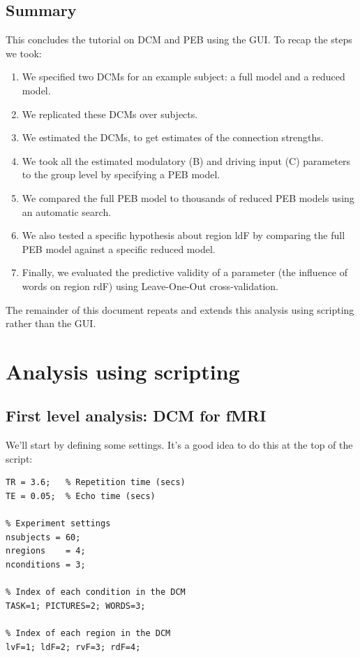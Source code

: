 \documentclass{article}
\begin{document}
\subsection{Summary} \label{GUI_summary}
This concludes the tutorial on DCM and PEB using the GUI. To recap the steps we took:
\begin{enumerate}
    \item We specified two DCMs for an example subject: a full model and a reduced model.
    \item We replicated these DCMs over subjects.
    \item We estimated the DCMs, to get estimates of the connection strengths.
    \item We took all the estimated modulatory (B) and driving input (C) parameters to the group level by specifying a PEB model.
    \item We compared the full PEB model to thousands of reduced PEB models using an automatic search.
    \item We also tested a specific hypothesis about region ldF by comparing the full PEB model against a specific reduced model.
    \item Finally, we evaluated the predictive validity of a parameter (the influence of words on region rdF) using Leave-One-Out cross-validation.
\end{enumerate}

The remainder of this document repeats and extends this analysis using scripting rather than the GUI.


\section{Analysis using scripting}
\subsection{First level analysis: DCM for fMRI}

We'll start by defining some settings. It's a good idea to do this at the top of the script:

\begin{lstlisting}[style=Matlab-editor,caption=Settings]
% MRI scanner settings
TR = 3.6;   % Repetition time (secs)
TE = 0.05;  % Echo time (secs)

% Experiment settings
nsubjects = 60;
nregions    = 4; 
nconditions = 3;

% Index of each condition in the DCM
TASK=1; PICTURES=2; WORDS=3;

% Index of each region in the DCM
lvF=1; ldF=2; rvF=3; rdF=4;
\end{lstlisting}
\end{document}
